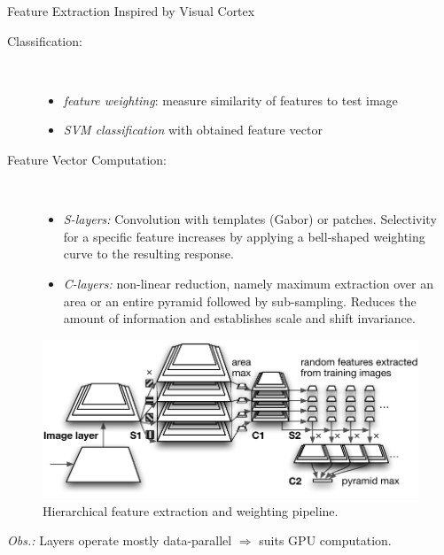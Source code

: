 \documentclass[final]{beamer}
\begin{document}
\begin{frame}{}
\begin{columns}[t]
\begin{column}{.48\linewidth}
\begin{block} {Feature Extraction Inspired by Visual Cortex}
\begin{description}
\item[Classification:]~
\begin{itemize}
	\item  \emph{feature weighting}: measure similarity of features to test image
	\item  \emph{SVM classification} with obtained feature vector
\end{itemize}

\item[Feature Vector Computation:]~ %
\begin{itemize}
\item
\emph{S-layers:} Convolution with templates (Gabor) or patches.
Selectivity for a specific feature increases by applying a bell-shaped weighting curve to the resulting response.
\item \emph{C-layers:} non-linear reduction, namely maximum
  extraction over an area or an entire pyramid followed by
  sub-sampling. Reduces the amount of information and establishes
 scale and shift invariance.\newline
\end{itemize}
\end{description}

\begin{figure}[tb]
\centering
\includegraphics[width=.7\linewidth]{images/pyramidq}
\caption{
  Hierarchical feature extraction and weighting pipeline.
}
\label{fig:pyramid}
\end{figure}
\emph{Obs.:} Layers operate mostly data-parallel $\Rightarrow$ suits GPU computation.\newline
        \end{block}


\end{column}
\end{columns}
\end{frame}
\end{document}
